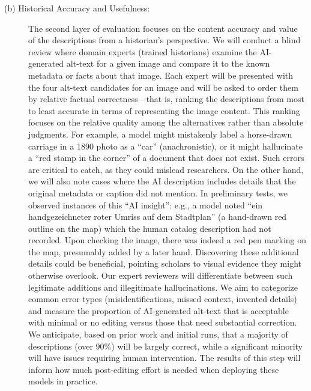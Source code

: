 \documentclass{anthology-ch}         %
\begin{document}
\begin{description}
\item[(b) Historical Accuracy and Usefulness:] The second layer of evaluation focuses on the content accuracy and value of the descriptions from a historian’s perspective. We will conduct a blind review where domain experts (trained historians) examine the AI-generated alt-text for a given image and compare it to the known metadata or facts about that image. Each expert will be presented with the four alt-text candidates for an image and will be asked to order them by relative factual correctness---that is, ranking the descriptions from most to least accurate in terms of representing the image content. This ranking focuses on the relative quality among the alternatives rather than absolute judgments. For example, a model might mistakenly label a horse-drawn carriage in a 1890 photo as a ``car'' (anachronistic), or it might hallucinate a ``red stamp in the corner'' of a document that does not exist. Such errors are critical to catch, as they could mislead researchers. On the other hand, we will also note cases where the AI description includes details that the original metadata or caption did not mention. In preliminary tests, we observed instances of this ``AI insight'': e.g., a model noted ``ein handgezeichneter roter Umriss auf dem Stadtplan'' (a hand-drawn red outline on the map) which the human catalog description had not recorded. Upon checking the image, there was indeed a red pen marking on the map, presumably added by a later hand. Discovering these additional details could be beneficial, pointing scholars to visual evidence they might otherwise overlook. Our expert reviewers will differentiate between such legitimate additions and illegitimate hallucinations. We aim to categorize common error types (misidentifications, missed context, invented details) and measure the proportion of AI-generated alt-text that is acceptable with minimal or no editing versus those that need substantial correction. We anticipate, based on prior work and initial runs, that a majority of descriptions (over 90\%) will be largely correct, while a significant minority will have issues requiring human intervention. The results of this step will inform how much post-editing effort is needed when deploying these models in practice.


\end{description}
\end{document}
